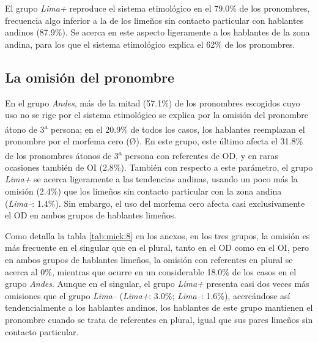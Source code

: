 \documentclass[output=paper]{../langscibook}
\begin{document}
El grupo \textit{Lima+} reproduce el sistema etimológico en el 79.0\% de los pronombres, frecuencia algo inferior a la de los limeños sin contacto particular con hablantes andinos (87.9\%). Se acerca en este aspecto ligeramente a los hablantes de la zona andina, para los que el sistema etimológico explica el 62\% de los pronombres.

\subsection{La omisión del pronombre}

En el grupo \textit{Andes}, más de la mitad (57.1\%) de los pronombres escogidos cuyo uso no se rige por el sistema etimológico se explica por la omisión del pronombre átono de 3\textsuperscript{a} persona; en el 20.9\% de todos los casos, los hablantes reemplazan el pronombre por el morfema cero (Ø). En este grupo, este último afecta el 31.8\% de los pronombres átonos de 3\textsuperscript{a} persona con referentes de OD, y en raras ocasiones también de OI (2.8\%). También con respecto a este parámetro, el grupo \textit{Lima+} se acerca ligeramente a las tendencias andinas, usando un poco más la omisión (2.4\%) que los limeños sin contacto particular con la zona andina (\textit{Lima–}: 1.4\%). Sin embargo, el uso del morfema cero afecta casi exclusivamente el OD en ambos grupos de hablantes limeños. 

Como detalla la tabla \ref{tab:mick:8} en los anexos, en los tres grupos, la omisión es más frecuente en el singular que en el plural, tanto en el OD como en el OI, pero en ambos grupos de hablantes limeños, la omisión con referentes en plural se acerca al 0\%, mientras que ocurre en un considerable 18.0\% de los casos en el grupo \textit{Andes}. Aunque en el singular, el grupo \textit{Lima+} presenta casi dos veces más omisiones que el grupo \textit{Lima}– (\textit{Lima+}: 3.0\%; \textit{Lima–}: 1.6\%), acercándose así tendencialmente a los hablantes andinos, los hablantes de este grupo mantienen el pronombre cuando se trata de referentes en plural, igual que sus pares limeños sin contacto particular.
\end{document}
